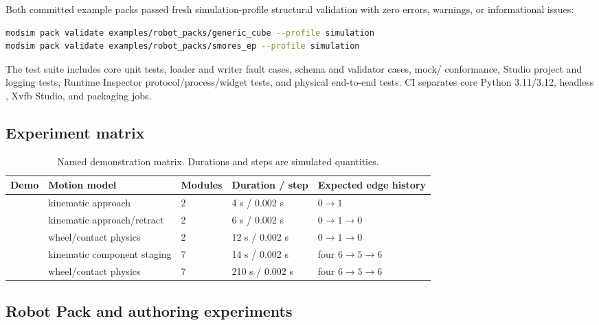 Both committed example packs passed fresh simulation-profile structural validation
with zero errors, warnings, or informational issues:

\begin{lstlisting}[language=bash]
modsim pack validate examples/robot_packs/generic_cube --profile simulation
modsim pack validate examples/robot_packs/smores_ep --profile simulation
\end{lstlisting}

The test suite includes core unit tests, loader and writer fault cases, schema and
validator cases, mock/\mujoco{} conformance, Studio project and logging tests,
Runtime Inspector protocol/process/widget tests, and physical end-to-end tests. CI
separates core Python 3.11/3.12, headless \mujoco{}, Xvfb Studio, and packaging jobs.

\subsection{Experiment matrix}

\begin{table}[htbp]
\centering
\caption{Named demonstration matrix. Durations and steps are simulated quantities.}
\label{tab:demo-matrix}
\begin{tabularx}{\textwidth}{L{0.24\textwidth}L{0.19\textwidth}L{0.10\textwidth}L{0.18\textwidth}Y}
\toprule
Demo & Motion model & Modules & Duration / step & Expected edge history \\
\midrule
{} & kinematic approach & 2 & 4 s / 0.002 s & $0\rightarrow1$ \\
 & kinematic approach/retract & 2 & 6 s / 0.002 s & $0\rightarrow1\rightarrow0$ \\
 & wheel/contact physics & 2 & 12 s / 0.002 s & $0\rightarrow1\rightarrow0$ \\
 & kinematic component staging & 7 & 14 s / 0.002 s & four $6\rightarrow5\rightarrow6$ \\
 & wheel/contact physics & 7 & 210 s / 0.002 s & four $6\rightarrow5\rightarrow6$ \\
\bottomrule
\end{tabularx}
\end{table}

\subsection{Robot Pack and authoring experiments}

